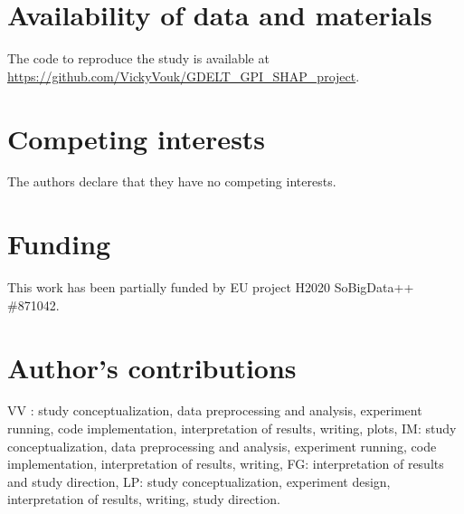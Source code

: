 \documentclass{bmcart}
\begin{document}
\newpage
\begin{backmatter}

\section*{Availability of data and materials}%
The code to reproduce the study is available at  \url{https://github.com/VickyVouk/GDELT_GPI_SHAP_project}. 

\section*{Competing interests}
  The authors declare that they have no competing interests.

\section*{Funding}
This work has been partially funded by EU project H2020 SoBigData++ \#871042.

\section*{Author's contributions}
VV : study conceptualization, data preprocessing and analysis, experiment running, code implementation, interpretation of results, writing, plots, IM: study conceptualization, data preprocessing and analysis, experiment running, code implementation, interpretation of results, writing, FG: interpretation of results and study direction, LP: study conceptualization, experiment design, interpretation of results, writing, study direction.


\end{backmatter}
\end{document}
